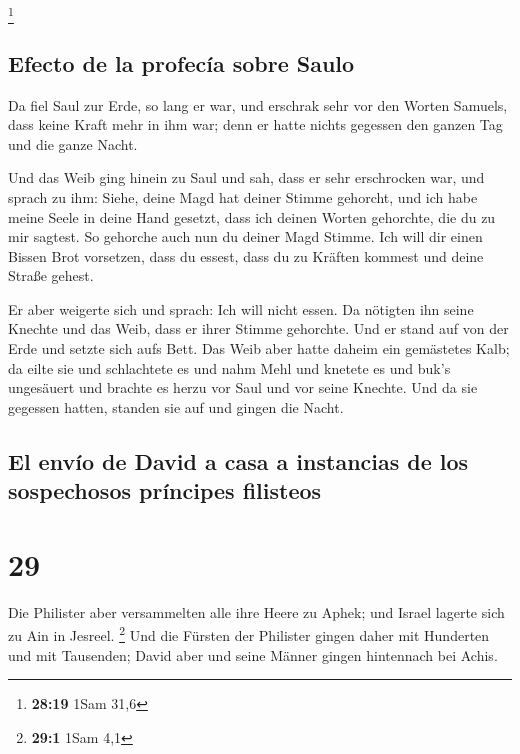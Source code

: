 \footnote{\textbf{28:19} 1Sam 31,6}

\hypertarget{efecto-de-la-profecuxeda-sobre-saulo}{%
\subsection{Efecto de la profecía sobre
Saulo}\label{efecto-de-la-profecuxeda-sobre-saulo}}

 Da fiel Saul zur Erde, so lang er war, und erschrak sehr
vor den Worten Samuels, dass keine Kraft mehr in ihm war; denn er hatte
nichts gegessen den ganzen Tag und die ganze Nacht.

 Und das Weib ging hinein zu Saul und sah, dass er sehr
erschrocken war, und sprach zu ihm: Siehe, deine Magd hat deiner Stimme
gehorcht, und ich habe meine Seele in deine Hand gesetzt, dass ich
deinen Worten gehorchte, die du zu mir sagtest.  So
gehorche auch nun du deiner Magd Stimme. Ich will dir einen Bissen Brot
vorsetzen, dass du essest, dass du zu Kräften kommest und deine Straße
gehest.

 Er aber weigerte sich und sprach: Ich will nicht essen.
Da nötigten ihn seine Knechte und das Weib, dass er ihrer Stimme
gehorchte. Und er stand auf von der Erde und setzte sich aufs Bett.
 Das Weib aber hatte daheim ein gemästetes Kalb; da eilte
sie und schlachtete es und nahm Mehl und knetete es und buk's ungesäuert
 und brachte es herzu vor Saul und vor seine Knechte. Und
da sie gegessen hatten, standen sie auf und gingen die Nacht.

\hypertarget{el-envuxedo-de-david-a-casa-a-instancias-de-los-sospechosos-pruxedncipes-filisteos}{%
\subsection{El envío de David a casa a instancias de los sospechosos
príncipes
filisteos}\label{el-envuxedo-de-david-a-casa-a-instancias-de-los-sospechosos-pruxedncipes-filisteos}}

\hypertarget{section-28}{%
\section{29}\label{section-28}}

 Die Philister aber versammelten alle ihre Heere zu Aphek;
und Israel lagerte sich zu Ain in Jesreel. \footnote{\textbf{29:1} 1Sam
  4,1}  Und die Fürsten der Philister gingen daher mit
Hunderten und mit Tausenden; David aber und seine Männer gingen
hintennach bei Achis.

